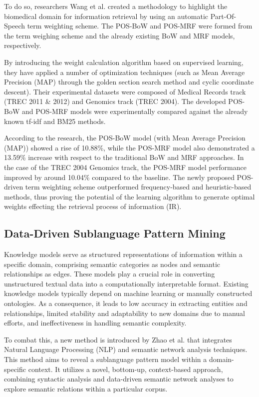 \documentclass[conference]{IEEEtran}
\begin{document}
To do so, researchers Wang et al. \cite{Wang2016} created a methodology to highlight the biomedical domain for information retrieval by using an automatic Part-Of-Speech term weighting scheme. The POS-BoW and POS-MRF were formed from the term weighing scheme and the already existing BoW and MRF models, respectively.

By introducing the weight calculation algorithm based on supervised learning, they have applied a number of optimization techniques (such as Mean Average Precision (MAP) through the golden section search method and cyclic coordinate descent). Their experimental datasets were composed of Medical Records track (TREC 2011 \& 2012) and Genomics track (TREC 2004). The developed POS-BoW and POS-MRF models were experimentally compared against the already known tf-idf and BM25 methods.

According to the research, the POS-BoW model (with Mean Average Precision (MAP)) showed a rise of 10.88\%, while the POS-MRF model also demonstrated a 13.59\% increase with respect to the traditional BoW and MRF approaches. In the case of the TREC 2004 Genomics track, the POS-MRF model performance improved by around 10.04\% compared to the baseline. The newly proposed POS-driven term weighting scheme outperformed frequency-based and heuristic-based methods, thus proving the potential of the learning algorithm to generate optimal weights effecting the retrieval process of information (IR).

\subsection{Data-Driven Sublanguage Pattern Mining}

Knowledge models serve as structured representations of information within a specific domain, comprising semantic categories as nodes and semantic relationships as edges. These models play a crucial role in converting unstructured textual data into a computationally interpretable format. Existing knowledge models typically depend on machine learning or manually constructed ontologies. As a consequence, it leads to low accuracy in extracting entities and relationships, limited stability and adaptability to new domains due to manual efforts, and ineffectiveness in handling semantic complexity.

To combat this, a new method is introduced by Zhao et al. \cite{Zhao2018} that integrates Natural Language Processing (NLP) and semantic network analysis techniques. This method aims to reveal a sublanguage pattern model within a domain-specific context. It utilizes a novel, bottom-up, context-based approach, combining syntactic analysis and data-driven semantic network analyses to explore semantic relations within a particular corpus.
\end{document}
